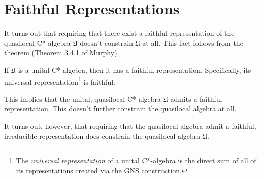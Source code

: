 \section{Faithful Representations}\label{sctn:faithful-representations}
It turns out that requiring that there exist a faithful representation of the quasilocal C*-algebra $\mathfrak{U}$ doesn't constrain $\mathfrak{U}$ at all. This fact follows from the theorem (Theorem 3.4.1 of \href{https://doi.org/10.1016/C2009-0-22289-6}{Murphy})
\begin{theorem}
    If $\mathfrak{U}$ is a unital C*-algebra, then it has a faithful representation. Specifically, its universal representation\footnote{The \textit{universal representation} of a unital C*-algebra is the direct sum of all of its representations created via the GNS construction.} is faithful.
\end{theorem}
\noindent This implies that the unital, quasilocal C*-algebra $\mathfrak{U}$ admits a faithful representation. This doesn't further constrain the quasilocal algebra at all.

It turns out, however, that requiring that the quasilocal algebra admit a faithful, irreducible representation does constrain the quasilocal algebra $\mathfrak{U}$.
